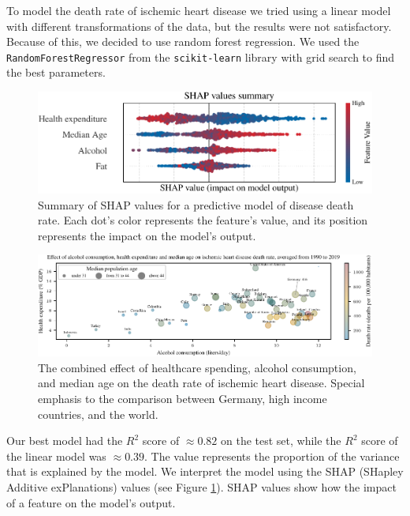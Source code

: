 
To model the death rate of ischemic heart disease we tried using a linear model with different transformations of the data, but the results were not satisfactory.
Because of this, we decided to use random forest regression. 
We used the \texttt{RandomForestRegressor} from the \texttt{scikit-learn} library \citep{scikit-learn} with grid search to find the best parameters. 
\begin{figure}[ht]
    \vskip 0.2in
    \begin{center}
    \centerline{\includegraphics[width=\columnwidth]{fig/fig_shap_values_summary.pdf}}
    \caption{Summary of SHAP values for a predictive model of disease death rate. 
    Each dot's color represents the feature's value, and its position represents the impact on the model's output.}
    \label{shap_values}
    \end{center}
    \vskip -0.2in
\end{figure}
\begin{figure}[ht]
    \vskip 0.2in
    \centering
    \centerline{\includegraphics[]{fig/fig_bubble_plot_factors.pdf}}
    \caption{The combined effect of healthcare spending, alcohol consumption, and median age on the death rate of ischemic heart disease. Special 
        emphasis to the comparison between Germany, high income countries, and the world.}
    \label{bubble_plot_factors}
\end{figure}
Our best model had the 
$R^2$ score of $\approx0.82$ on the test set, while the $R^2$ score of the linear model was $\approx0.39$. The value represents the proportion of the variance that 
is explained by the model. We interpret the model using the SHAP (SHapley Additive exPlanations) values \citep{NIPS2017_7062} (see Figure \ref{shap_values}). SHAP values 
show how the impact of a feature on the model's output. 






